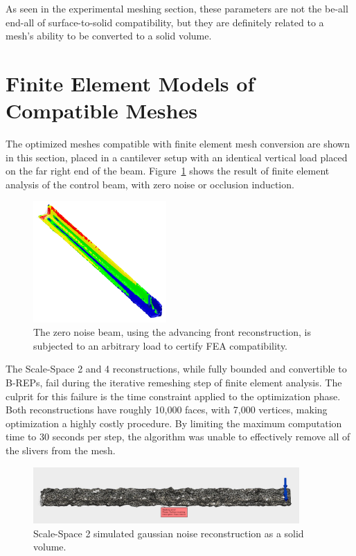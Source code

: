 \documentclass[12pt]{drexelthesis}
\let\Oldsection\section
\renewcommand{\section}{\FloatBarrier\Oldsection}
\begin{document}
As seen in the experimental meshing section, these parameters are not the be-all end-all of surface-to-solid compatibility, but they are definitely related to a mesh's ability to be converted to a solid volume.

\section{Finite Element Models of Compatible Meshes}
\label{sec:FEAresults}
The optimized meshes compatible with finite element mesh conversion are shown in this section, placed in a cantilever setup with an identical vertical load placed on the far right end of the beam. Figure~\ref{conc:zeronoiseload} shows the result of finite element analysis of the control beam, with zero noise or occlusion induction.

\begin{figure}[!ht]
	\centering
		\includegraphics[width=2in]{conclusion/advancedfrontloading.png}
		\caption[FEA loading results on the zero noise beam]{\centering The zero noise beam, using the advancing front reconstruction, is subjected to an arbitrary load to certify FEA compatibility.}
	\label{conc:zeronoiseload}
\end{figure} 

The Scale-Space 2 and 4 reconstructions, while fully bounded and convertible to B-REPs, fail during the iterative remeshing step of finite element analysis. The culprit for this failure is the time constraint applied to the optimization phase. Both reconstructions have roughly 10,000 faces, with 7,000 vertices, making optimization a highly costly procedure. By limiting the maximum computation time to 30 seconds per step, the algorithm was unable to effectively remove all of the slivers from the mesh. 

\begin{figure}[!ht]
	\centering
		\includegraphics[width=4in]{conclusion/noiseSS2Bounded.jpg}
		\caption[Optimized gaussian noise reconstruction as a solid volume]{\centering Scale-Space 2 simulated gaussian noise reconstruction as a solid volume.}
	\label{conc:gnoisesolid}
\end{figure}
\end{document}
